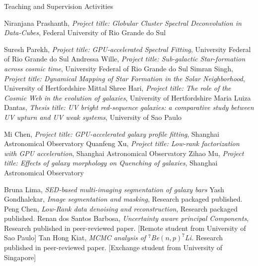 \begin{rubric}{Teaching and Supervision Activities}



\entry*[2025-2029]%
Niranjana Prashanth,
\emph{Project title: Globular Cluster Spectral Deconvolution in Data-Cubes},  Federal University of Rio Grande do Sul
%

\entry*[2025-2029]%
Suresh Parekh,
\emph{Project title: GPU-accelerated Spectral Fitting}, University Federal of Rio Grande do Sul
%
\entry*[2025-2029]%
Andressa Wille,
\emph{Project title: Sub-galactic Star-formation across cosmic time}, University Federal of Rio Grande do Sul
%
\entry*[2024-2027]%
Simran Singh,
\emph{Project title: Dynamical Mapping of Star Formation in the Solar Neighborhood}, University of Hertfordshire
%
\entry*[2024-2027]%
Mittal Shree Hari,
\emph{Project title: The role of the Cosmic Web in the evolution of galaxies}, University of Hertfordshire
%
\entry*[2016-2020]%
Maria Luiza Dantas,
\emph{Thesis title: UV bright red-sequence galaxies: a comparative study between UV upturn and UV weak systems}, University of Sao Paulo
%


\entry*[2022-2024] Mi Chen,
\emph{Project title: GPU-accelerated galaxy profile fitting}, Shanghai Astronomical Observatory
%
\entry*[2021-2023]%
Quanfeng Xu,
\emph{Project title: Low-rank factorization with GPU acceleration}, Shanghai Astronomical Observatory
%
\entry*[2021-2023]%
Zihao Mu,
\emph{Project title: Effects of galaxy morphology on Quenching of galaxies}, 
Shanghai Astronomical Observatory
%



%
\entry*[2025-- 2027]%
Bruna Lima,
\emph{SED-based multi-imaging segmentation of galaxy bars}
%
\entry*[2021-- 2024]%
Yash Gondhalekar,
\emph{Image segmentation and masking},
Research packaged published.
%
\entry*[2021--2022 ]%
Peng Chen,
\emph{Low-Rank data denoising and reconstruction},
Research packaged published.
%
\entry*[2019]%
Renan dos Santos Barbosa,
\emph{Uncertainty aware principal Components},
Research published in peer-reviewed paper. [Remote  student from University of Sao Paulo]
%
\entry*[2019]%
Tan Hong Kiat,
\emph{MCMC analysis of $^7$Be$(n,p)^7$Li.}
Research published in peer-reviewed paper. [Exchange student from University of Singapore]


\end{rubric}
